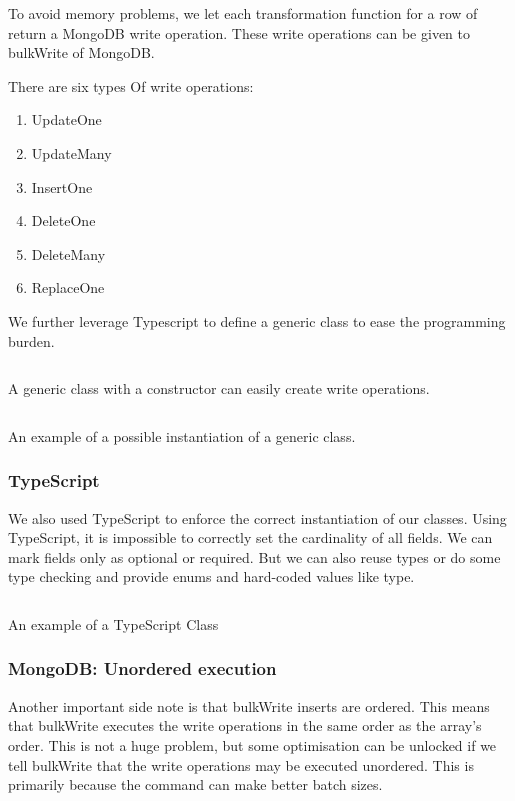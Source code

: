 To avoid memory problems, we let each transformation function for a row of  return a MongoDB write operation. These write operations can be given to bulkWrite of MongoDB. 

There are six types Of write operations:
\begin{enumerate}
    \item UpdateOne
    \item UpdateMany
    \item InsertOne
    \item DeleteOne
    \item DeleteMany
    \item ReplaceOne
\end{enumerate}

We further leverage Typescript to define a generic class to ease the programming burden. 

\begin{listing}[H]
    \inputminted[linenos,frame=single,breaklines]{TypeScript}{code/type_write_op.ts}
    \caption{A generic class with a constructor can easily create write operations.}
\end{listing}

\begin{listing}[H]
    \inputminted[linenos,frame=single,breaklines]{TypeScript}{code/type_write_op_instan.ts}
    \caption{An example of a possible instantiation of a generic class.}
\end{listing}
\subsubsection{TypeScript}
We also used TypeScript to enforce the correct instantiation of our classes. Using TypeScript, it is impossible to correctly set the cardinality of all fields. We can mark fields only as optional or required. But we can also reuse types or do some type checking and provide enums and hard-coded values like type. 
\begin{listing}[H]
    \inputminted[linenos,frame=single,breaklines]{TypeScript}{code/typescript.ts}
    \caption{An example of a TypeScript Class}
\end{listing}
\subsubsection{MongoDB: Unordered execution}
Another important side note is that bulkWrite inserts are ordered. This means that bulkWrite executes the write operations in the same order as the array's order. This is not a huge problem, but some optimisation can be unlocked if we tell bulkWrite that the write operations may be executed unordered. This is primarily because the command can make better batch sizes. 

